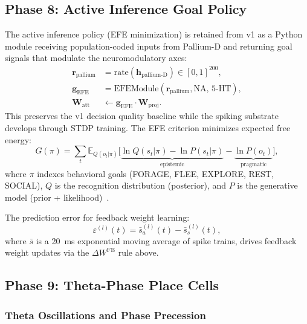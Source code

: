 \documentclass[11pt,a4paper]{article}
\begin{document}
\subsection{Phase 8: Active Inference Goal Policy}\label{sec:phase8}

The active inference policy (EFE minimization) is retained from v1
as a Python module receiving population-coded inputs from Pallium-D
and returning goal signals that modulate the neuromodulatory axes:
\begin{equation}\label{eq:ai_interface}
\begin{aligned}
  \mathbf{r}_\mathrm{pallium} &= \mathrm{rate}(\mathbf{h}_\mathrm{pallium\text{-}D})
    \in [0,1]^{200}, \\
  \mathbf{g}_\mathrm{EFE} &= \mathrm{EFEModule}(\mathbf{r}_\mathrm{pallium},
    \mathrm{NA},\,\mathrm{5\text{-}HT}), \\
  \mathbf{W}_\mathrm{att} &\leftarrow \mathbf{g}_\mathrm{EFE} \cdot \mathbf{W}_\mathrm{proj}.
\end{aligned}
\end{equation}
This preserves the v1 decision quality baseline while the spiking
substrate develops through STDP training.
The EFE criterion minimizes expected free energy:
\begin{equation}\label{eq:efe}
  G(\pi) = \sum_{t} \mathbb{E}_{Q(o_t|\pi)}\bigl[
    \underbrace{\ln Q(s_t|\pi) - \ln P(s_t|\pi)}_\mathrm{epistemic}
    - \underbrace{\ln P(o_t)}_\mathrm{pragmatic}
  \bigr],
\end{equation}
where $\pi$ indexes behavioral goals (FORAGE, FLEE, EXPLORE, REST, SOCIAL),
$Q$ is the recognition distribution (posterior), and $P$ is the
generative model (prior + likelihood)~\cite{friston2010}.

The prediction error for feedback weight learning:
\begin{equation}
  \varepsilon^{(l)}(t) = \bar{s}_a^{(l)}(t) - \bar{s}_s^{(l)}(t),
\end{equation}
where $\bar{s}$ is a 20~ms exponential moving average of spike trains,
drives feedback weight updates via the $\Delta W^\mathrm{FB}$ rule above.

\subsection{Phase 9: Theta-Phase Place Cells}\label{sec:phase9}

\subsubsection{Theta Oscillations and Phase Precession}
\end{document}
